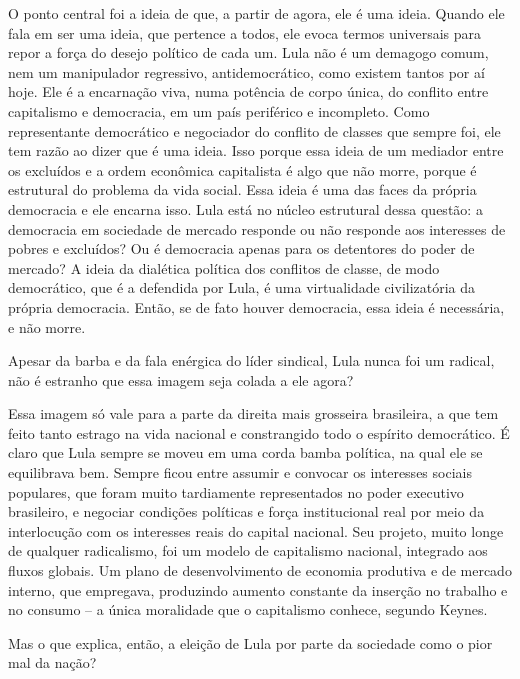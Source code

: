 O ponto central foi a ideia de que, a partir de agora, ele é uma ideia.
Quando ele fala em ser uma ideia, que pertence a todos, ele evoca termos
universais para repor a força do desejo político de cada um. Lula não é
um demagogo comum, nem um manipulador regressivo, antidemocrático, como
existem tantos por aí hoje. Ele é a encarnação viva, numa potência de
corpo única, do conflito entre capitalismo e democracia, em um país
periférico e incompleto. Como representante democrático e negociador do
conflito de classes que sempre foi, ele tem razão ao dizer que é uma
ideia. Isso porque essa ideia de um mediador entre os excluídos e a
ordem econômica capitalista é algo que não morre, porque é estrutural do
problema da vida social. Essa ideia é uma das faces da própria
democracia e ele encarna isso. Lula está no núcleo estrutural dessa
questão: a democracia em sociedade de mercado responde ou não responde
aos interesses de pobres e excluídos? Ou é democracia apenas para os
detentores do poder de mercado? A ideia da dialética política dos
conflitos de classe, de modo democrático, que é a defendida por Lula, é
uma virtualidade civilizatória da própria democracia. Então, se de fato
houver democracia, essa ideia é necessária, e não morre.

Apesar da barba e da fala enérgica do líder sindical, Lula nunca foi um
radical, não é estranho que essa imagem seja colada a ele agora?

Essa imagem só vale para a parte da direita mais grosseira brasileira, a
que tem feito tanto estrago na vida nacional e constrangido todo o
espírito democrático. É claro que Lula sempre se moveu em uma corda
bamba política, na qual ele se equilibrava bem. Sempre ficou entre
assumir e convocar os interesses sociais populares, que foram muito
tardiamente representados no poder executivo brasileiro, e negociar
condições políticas e força institucional real por meio da interlocução
com os interesses reais do capital nacional. Seu projeto, muito longe de
qualquer radicalismo, foi um modelo de capitalismo nacional, integrado
aos fluxos globais. Um plano de desenvolvimento de economia produtiva e
de mercado interno, que empregava, produzindo aumento constante da
inserção no trabalho e no consumo -- a única moralidade que o
capitalismo conhece, segundo Keynes.

Mas o que explica, então, a eleição de Lula por parte da sociedade como
o pior mal da nação?

